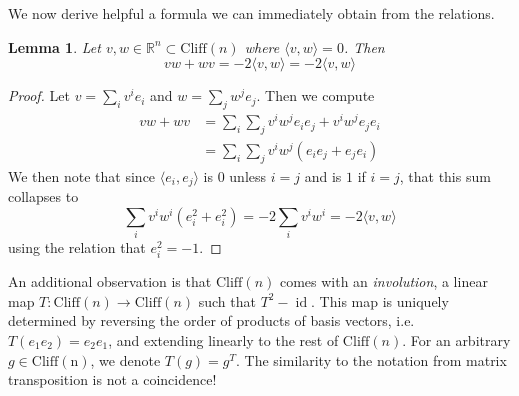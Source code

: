 \documentclass{article}
\newcommand{\R}{\mathbb{R}}
\newtheorem{lemma}{Lemma}[subsection]
\DeclareMathOperator{\id}{id}
\begin{document}
We now derive helpful a formula we can immediately obtain from the relations.
\begin{lemma}
Let $v,w \in \R^n \subset \mathrm{Cliff}(n)$ where $\langle v,w \rangle = 0$. Then
$$vw + wv = -2 \langle v, w \rangle = -2\langle v,w \rangle $$
\end{lemma}
\begin{proof}
Let $v = \sum_i v^ie_i$ and $w = \sum_j w^je_j$. Then we compute
\begin{align*}
vw + wv &= \sum_i \sum_j v^iw^j e_ie_j + v^iw^je_je_i \\
&= \sum_i\sum_j v^iw^j(e_ie_j + e_je_i) 
\end{align*}
We then note that since $\langle e_i, e_j \rangle$ is $0$ unless $i = j$ and is $1$ if $i = j$, that this sum collapses to 
$$\sum_i v^iw^i(e_i^2 + e_i^2) = -2\sum_iv^iw^i  = -2\langle v,w \rangle$$
using the relation that $e_i^2 = -1$.
\end{proof}
An additional observation is that $\mathrm{Cliff}(n)$ comes with an \emph{involution}, a linear map $T : \mathrm{Cliff}(n) \to \mathrm{Cliff}(n)$ such that $T^2 - \id$. This map is uniquely determined by reversing the order of products of basis vectors, i.e. $T(e_1e_2) = e_2e_1$, and extending linearly to the rest of $\mathrm{Cliff}(n)$. For an arbitrary $g \in \mathrm{Cliff(n)}$, we denote $T(g) = g^T$. The similarity to the notation from matrix transposition is not a coincidence!
\end{document}

